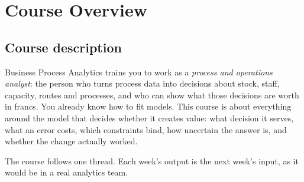 \chapter*{Course Overview}

\section*{Course description}
Business Process Analytics trains you to work as a \emph{process and operations analyst}: the person who turns process
data into decisions about stock, staff, capacity, routes and processes, and who can show what those decisions are
worth in francs. You already know how to fit models. This course is about everything around the model that
decides whether it creates value: what decision it serves, what an error costs, which constraints bind, how
uncertain the answer is, and whether the change actually worked.

The course follows one thread. Each week's output is the next week's input, as it would be in a real analytics team.

